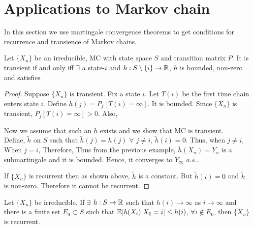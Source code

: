 \documentclass[all-lectures.tex]{subfiles}
\begin{document}
\section{Applications to Markov chain}
In this section we use martingale convergence theorems to get conditions for recurrence and transience of Markov chains.
\begin{thm}
Let $\{X_n\}$ be an irreducible, MC with state space $S$ and transition matrix $P$.
It is transient if and only iff $\exists$ a state-$i$ and $h:S \setminus \{i\} \to \mathbb{R}$, $h$ is bounded, non-zero and satisfies 
\end{thm}
\begin{proof}
Suppose $\{X_n\}$ is transient. 
Fix a state $i$. 
Let $T(i)$ be the first time chain enters state $i$.
Define $h(j) = P_j[T(i) = \infty]$. 
It is  bounded.
Since  $\{X_n\}$ is transient, $P_j[T(i) = \infty] > 0$.
Also, 

Now we assume that such an $h$ exists and we show that MC is transient.\\
Define, $\tilde{h}$ on $S$ such that $\tilde{h}(j) = h(j)$ \quad $\forall$ $j \neq i$, $\tilde{h}(i)=0$.
Thus,
when $j \neq i$,
When $j=i$,
Therefore,
Thus from the previous example, $\tilde{h}(X_n) = Y_n$ is a submartingale and it is bounded.
Hence, it converges  to $Y_\infty$ $a.s.$.

If $\{X_n\}$ is recurrent then  as shown above, $\tilde{h}$ is a constant. But $\tilde{h}(i) = 0$ and $\tilde{h}$ is non-zero. Therefore it cannot be recurrent.
\end{proof}
\begin{thm}
Let  $\{X_n\}$ be irreducible. If $\exists$ $h:S \to \mathbb{R}$ such that $h(i) \to \infty$ as $i \to \infty$ and there is a finite set $E_0 \subset S$ such that $\mathbb{E}[h(X_i)|X_0=i] \le h(i)$, $\forall i \notin E_0$, then $\{X_n\}$ is recurrent.
\end{thm}
\end{document}
